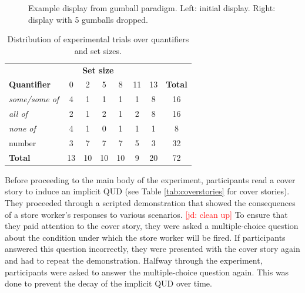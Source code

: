 \documentclass[10pt,letterpaper]{article}
\newcommand{\jd}[1]{\textcolor{Red}{[jd: #1]}}
\begin{document}
\begin{figure}
\centering
{}
\caption{Example display from gumball paradigm. Left: initial display. Right: display with 5 gumballs dropped.  \label{fig:gumball-paradigm}}
\end{figure}


  \begin{table}
      \begin{tabular}{lccccccc}
      \midrule
      \multicolumn{8}{c}{\textbf{Set size}} \\
      \textbf{Quantifier} & 0 & 2 & 5 & 8 & 11 & 13 & \multicolumn{1}{l}{\textbf{Total}} \\
      \midrule
      \textit{some/some of} & 4 & 1 & 1 & 1 & 1 & 8 & 16 \\
      \textit{all of} & 2 & 1 & 2 & 1 & 2 & 8 & 16 \\
      \textit{none of} & 4 & 1 & 0 & 1 & 1 & 1 & 8 \\
      number & 3 & 7 & 7 & 7 & 5 & 3 & 32 \\
      \bottomrule
      \textbf{Total} & 13 & 10 & 10 & 10 & 9 & 20 & 72
      \end{tabular}
    \caption{Distribution of experimental trials over quantifiers and set sizes.\label{tab:stimuli}}
  \end{table}
  
Before proceeding to the main body of the experiment, participants read a cover story to induce an implicit QUD (see Table \ref{tab:coverstories} for cover stories). They proceeded through a scripted demonstration that showed the consequences of a store worker's responses to various scenarios. \jd{clean up} To ensure that they paid attention to the cover story, they were asked a multiple-choice question about the condition under which the store worker will be fired. If participants answered this question incorrectly, they were presented with the cover story again and had to repeat the demonstration. Halfway through the experiment, participants were asked to answer the multiple-choice question again. This was done to prevent the decay of the implicit QUD over time.  
  
\end{document}
